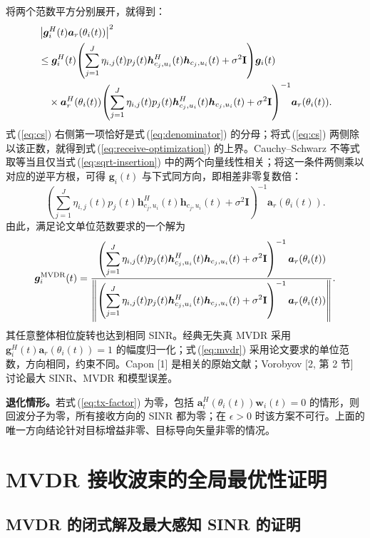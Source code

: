 \documentclass[11pt,a4paper]{ctexart}
\begin{document}
将两个范数平方分别展开，就得到：
\begin{align}
&\left|\bm g_i^H(t)\bm a_r(\theta_i(t))\right|^2\notag\\
&\le\bm g_i^H(t)\!\left(\sum_{j=1}^J\eta_{i,j}(t)p_j(t)
\bm h_{c_j,u_i}^{H}(t)\bm h_{c_j,u_i}(t)+\sigma^2\mathbf I\right)\!\bm g_i(t)\notag\\
&\quad\times\bm a_r^H(\theta_i(t))\!\left(\sum_{j=1}^J\eta_{i,j}(t)p_j(t)
\bm h_{c_j,u_i}^{H}(t)\bm h_{c_j,u_i}(t)+\sigma^2\mathbf I\right)^{-1}\!\bm a_r(\theta_i(t)).\label{eq:cs}
\end{align}
式\,(\ref{eq:cs}) 右侧第一项恰好是式\,(\ref{eq:denominator}) 的分母；将式\,(\ref{eq:cs}) 两侧除以该正数，就得到式\,(\ref{eq:receive-optimization}) 的上界。Cauchy--Schwarz 不等式取等当且仅当式\,(\ref{eq:sqrt-insertion}) 中的两个向量线性相关；将这一条件两侧乘以对应的逆平方根，可得 $\bm g_i(t)$ 与下式同方向，即相差非零复数倍：
\begin{equation}\label{eq:direction}
\left(\sum_{j=1}^J\eta_{i,j}(t)p_j(t)
\bm h_{c_j,u_i}^{H}(t)\bm h_{c_j,u_i}(t)+\sigma^2\mathbf I\right)^{-1}
\bm a_r(\theta_i(t)).
\end{equation}
由此，满足论文单位范数要求的一个解为
\begin{equation}\label{eq:mvdr}
\bm g_i^{\rm MVDR}(t)=
\frac{\left(\displaystyle\sum_{j=1}^J\eta_{i,j}(t)p_j(t)
\bm h_{c_j,u_i}^{H}(t)\bm h_{c_j,u_i}(t)+\sigma^2\mathbf I\right)^{-1}
\bm a_r(\theta_i(t))}
{\left\|\left(\displaystyle\sum_{j=1}^J\eta_{i,j}(t)p_j(t)
\bm h_{c_j,u_i}^{H}(t)\bm h_{c_j,u_i}(t)+\sigma^2\mathbf I\right)^{-1}
\bm a_r(\theta_i(t))\right\|}.
\end{equation}
其任意整体相位旋转也达到相同 SINR。经典无失真 MVDR 采用 $\bm g_i^H(t)\bm a_r(\theta_i(t))=1$ 的幅度归一化；式\,(\ref{eq:mvdr}) 采用论文要求的单位范数，方向相同，约束不同。Capon [1] 是相关的原始文献；Vorobyov [2, 第 2 节] 讨论最大 SINR、MVDR 和模型误差。

\textbf{退化情形。}若式\,(\ref{eq:tx-factor}) 为零，包括 $\bm a_t^H(\theta_i(t))\bm w_i(t)=0$ 的情形，则回波分子为零，所有接收方向的 SINR 都为零；在 $\epsilon>0$ 时该方案不可行。上面的唯一方向结论针对目标增益非零、目标导向矢量非零的情况。

\section{MVDR 接收波束的全局最优性证明}

\subsection{MVDR 的闭式解及最大感知 SINR 的证明}
\end{document}

